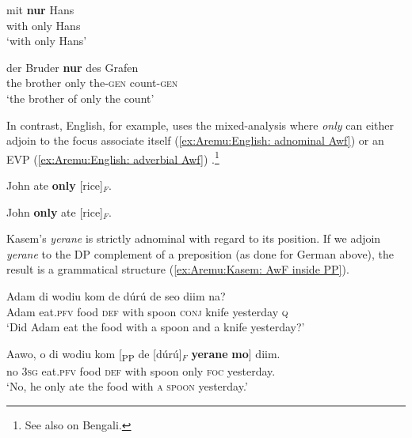 \documentclass[output=paper,colorlinks,citecolor=brown,draftmode
]{langscibook}
\begin{document}
\ea \label{ex:Aremu:German: AwF inside PP}
\begin{xlist}
    
\ex 
\gll*mit \textbf{nur} Hans\\
     with only Hans\\
\glt `with only Hans'

\ex *[\textsubscript{PP} P FP DP]

\end{xlist}
\z

\ea \label{ex:Aremu:German: AwF inside complex DP}
\begin{xlist}
\ex 
\gll *der Bruder \textbf{nur} des Grafen\\
    the brother only the-\textsc{gen} count-\textsc{gen}\\
\glt `the brother of only the count'

\ex *[\textsubscript{DP} D FP DP]

\end{xlist}
\z

In contrast, English, for example, uses the mixed-analysis where \textit{only} can either adjoin to the focus associate itself (\ref{ex:Aremu:English: adnominal Awf}) or an EVP (\ref{ex:Aremu:English: adverbial Awf}) \citep{konig1991meaning, erlewine2014b}.\footnote{See also \citet{konig1991meaning} on Bengali.}

\ea
\begin{xlist}

\ex \label{ex:Aremu:English: adnominal Awf} John ate \textbf{only} [rice]$_F$.

\ex \label{ex:Aremu:English: adverbial Awf} John \textbf{only} ate [rice]$_F$.
    
\end{xlist}
\z

Kasem's \textit{yerane} is strictly adnominal with regard to its position. If we adjoin \textit{yerane} to the DP complement of a preposition (as done for German above), the result is a grammatical structure (\ref{ex:Aremu:Kasem: AwF inside PP}).

\ea
\begin{xlist}

\ex
\gll Adam di wodiu kom de dúrú de seo diim na?\\
	Adam eat.\textsc{pfv} food \textsc{def} with spoon \textsc{conj} knife yesterday \textsc{q}\\
\glt `Did Adam eat the food with a spoon and a knife yesterday?'

\ex \label{ex:Aremu:Kasem: AwF inside PP}
\gll Aawo, o di wodiu kom [\textsubscript{PP} de  [dúrú]$_F$ \textbf{yerane} \textbf{mo}] diim.\\
		no 3\textsc{sg} eat.\textsc{pfv} food \textsc{def} {} with spoon only \textsc{foc} yesterday.\\
\glt `No, he only ate the food with \textsc{a spoon} yesterday.'

\end{xlist}
\z
\end{document}
